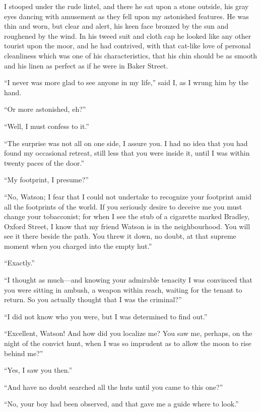 \documentclass[paper=5.5in:8.5in,BCOR=7mm,twoside,DIV=calc,12pt,usegeometry,openany,chapterprefix,endperiod,headings=big]{scrbook} %
\begin{document}
I stooped under the rude lintel, and there he sat upon a stone outside, his gray eyes dancing with amusement as they fell upon my astonished features. He was thin and worn, but clear and alert, his keen face bronzed by the sun and roughened by the wind. In his tweed suit and cloth cap he looked like any other tourist upon the moor, and he had contrived, with that cat-like love of personal cleanliness which was one of his characteristics, that his chin should be as smooth and his linen as perfect as if he were in Baker Street.



\enquote{I never was more glad to see anyone in my life,} said I, as I wrung him by the hand.

\enquote{Or more astonished, eh?}

\enquote{Well, I must confess to it.}

\enquote{The surprise was not all on one side, I assure you. I had no idea that you had found my occasional retreat, still less that you were inside it, until I was within twenty paces of the door.}

\enquote{My footprint, I presume?}

\enquote{No, Watson; I fear that I could not undertake to recognize your footprint amid all the footprints of the world. If you seriously desire to deceive me you must change your tobacconist; for when I see the stub of a cigarette marked Bradley, Oxford Street, I know that my friend Watson is in the neighbourhood. You will see it there beside the path. You threw it down, no doubt, at that supreme moment when you charged into the empty hut.}

\enquote{Exactly.}

\enquote{I thought as much---and knowing your admirable tenacity I was convinced that you were sitting in ambush, a weapon within reach, waiting for the tenant to return. So you actually thought that I was the criminal?}

\enquote{I did not know who you were, but I was determined to find out.}

\enquote{Excellent, Watson! And how did you localize me? You saw me, perhaps, on the night of the convict hunt, when I was so imprudent as to allow the moon to rise behind me?}

\enquote{Yes, I saw you then.}

\enquote{And have no doubt searched all the huts until you came to this one?}

\enquote{No, your boy had been observed, and that gave me a guide where to look.}
\end{document}
